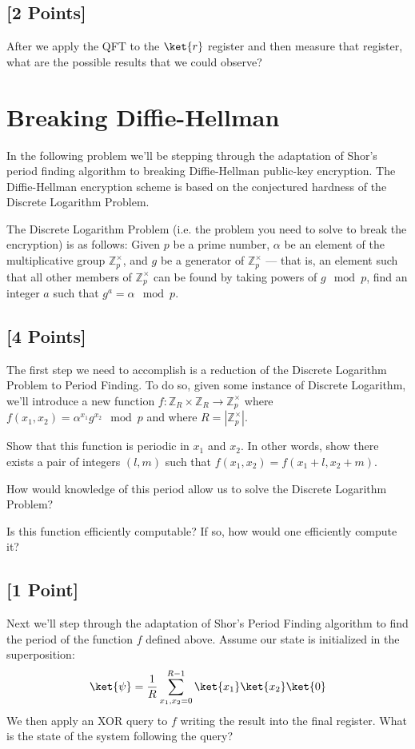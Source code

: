 \documentclass[11pt]{article}
\begin{document}
\subsection{[2 Points]} After we apply the QFT to the $\ket{r}$ register and then measure that register, what are the possible results that we could observe?





\section{Breaking Diffie-Hellman}
In the following problem we'll be stepping through the adaptation of Shor's period finding algorithm to breaking Diffie-Hellman public-key encryption. The Diffie-Hellman encryption scheme is based on the conjectured hardness of the Discrete Logarithm Problem. 

The Discrete Logarithm Problem (i.e. the problem you need to solve to break the encryption) is as follows: Given $p$ be a prime number, $\alpha$ be an element of the multiplicative group $\mathbb{Z}_p^\times$, and $g$ be a generator of $\mathbb{Z}_p^\times$ --- that is, an element such that all other members of $\mathbb{Z}_p^\times$ can be found by taking powers of $g \mod p$, find an integer $a$ such that $g^a= \alpha \mod p$.

\subsection{[4 Points]} The first step we need to accomplish is a reduction of the Discrete Logarithm Problem to Period Finding. To do so, given some instance of Discrete Logarithm, we'll introduce a new function $f:\mathbb{Z}_R \times \mathbb{Z}_R \rightarrow \mathbb{Z}_p^\times$ where $f(x_1,x_2)= \alpha^{x_1} g^{x_2}\mod p$ and where $R=|\mathbb{Z}_p^\times|$. 

\noindent Show that this function is periodic in $x_1$ and $x_2$. In other words, show there exists a pair of integers $(l,m)$ such that $f(x_1,x_2)= f(x_1+l,x_2+m)$. 

\noindent How would knowledge of this period allow us to solve the Discrete Logarithm Problem? 

\noindent Is this function efficiently computable? If so, how would one efficiently compute it?



\subsection{[1 Point]} Next we'll step through the adaptation of Shor's Period Finding algorithm to find the period of the function $f$ defined above. Assume our state is initialized in the superposition:
\[
\ket{\psi} = \frac{1}{R}\sum_{x_1,x_2 =0}^{R-1}  \ket{x_1}\ket{x_2}\ket{0}
\]
We then apply an XOR query to $f$ writing the result into the final register. What is the state of the system following the query?
\end{document}
